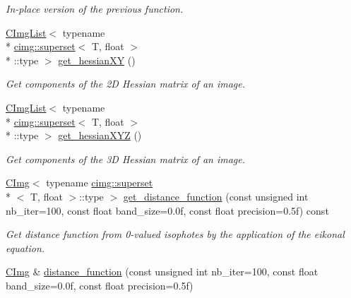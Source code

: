 \begin{DoxyCompactItemize}
\begin{DoxyCompactList}\small\item\em In-\/place version of the previous function. \end{DoxyCompactList}\item 
\hyperlink{structcimg__library_1_1_c_img_list}{C\-Img\-List}$<$ typename \\*
\hyperlink{structcimg__library_1_1cimg_1_1superset}{cimg\-::superset}$<$ T, float $>$\\*
\-::type $>$ \hyperlink{structcimg__library_1_1_c_img_a97e75b5076a36e080dd7b3e6f95aa63a}{get\-\_\-hessian\-X\-Y} ()
\begin{DoxyCompactList}\small\item\em Get components of the 2\-D Hessian matrix of an image. \end{DoxyCompactList}\item 
\hyperlink{structcimg__library_1_1_c_img_list}{C\-Img\-List}$<$ typename \\*
\hyperlink{structcimg__library_1_1cimg_1_1superset}{cimg\-::superset}$<$ T, float $>$\\*
\-::type $>$ \hyperlink{structcimg__library_1_1_c_img_af41c30684addca77ad5f1a99b5c7432a}{get\-\_\-hessian\-X\-Y\-Z} ()
\begin{DoxyCompactList}\small\item\em Get components of the 3\-D Hessian matrix of an image. \end{DoxyCompactList}\item 
\hypertarget{structcimg__library_1_1_c_img_ad2534975720f06945baa0cba99713f54}{\hyperlink{structcimg__library_1_1_c_img}{C\-Img}$<$ typename \hyperlink{structcimg__library_1_1cimg_1_1superset}{cimg\-::superset}\\*
$<$ T, float $>$\-::type $>$ \hyperlink{structcimg__library_1_1_c_img_ad2534975720f06945baa0cba99713f54}{get\-\_\-distance\-\_\-function} (const unsigned int nb\-\_\-iter=100, const float band\-\_\-size=0.\-0f, const float precision=0.\-5f) const }\label{structcimg__library_1_1_c_img_ad2534975720f06945baa0cba99713f54}

\begin{DoxyCompactList}\small\item\em Get distance function from 0-\/valued isophotes by the application of the eikonal equation. \end{DoxyCompactList}\item 
\hypertarget{structcimg__library_1_1_c_img_a0026b6e24aacb4d6fe5cf1434383723d}{\hyperlink{structcimg__library_1_1_c_img}{C\-Img} \& \hyperlink{structcimg__library_1_1_c_img_a0026b6e24aacb4d6fe5cf1434383723d}{distance\-\_\-function} (const unsigned int nb\-\_\-iter=100, const float band\-\_\-size=0.\-0f, const float precision=0.\-5f)}\label{structcimg__library_1_1_c_img_a0026b6e24aacb4d6fe5cf1434383723d}


\end{DoxyCompactItemize}
